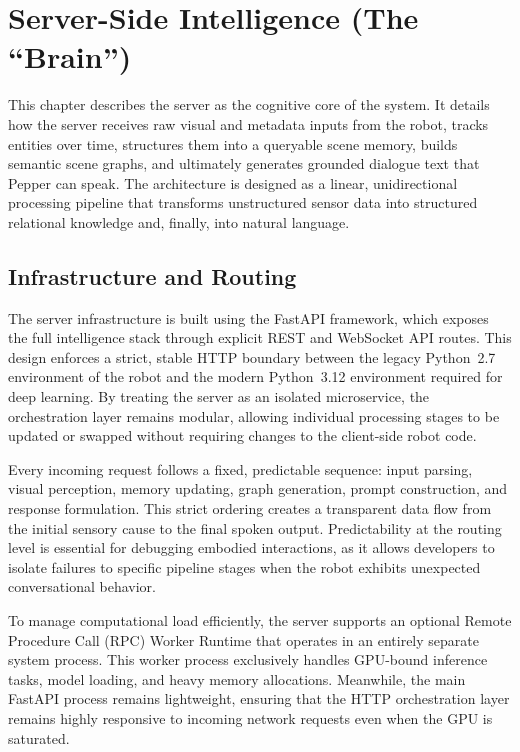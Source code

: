 \chapter{Server-Side Intelligence (The ``Brain'')}
\label{chap:server_side}

This chapter describes the server as the cognitive core of the system. It details how the server receives raw visual and metadata inputs from the robot, tracks entities over time, structures them into a queryable scene memory, builds semantic scene graphs, and ultimately generates grounded dialogue text that Pepper can speak. The architecture is designed as a linear, unidirectional processing pipeline that transforms unstructured sensor data into structured relational knowledge and, finally, into natural language.

\section{Infrastructure and Routing}
\label{sec:infrastructure}

The server infrastructure is built using the FastAPI framework, which exposes the full intelligence stack through explicit REST and WebSocket API routes. This design enforces a strict, stable HTTP boundary between the legacy Python~2.7 environment of the robot and the modern Python~3.12 environment required for deep learning. By treating the server as an isolated microservice, the orchestration layer remains modular, allowing individual processing stages to be updated or swapped without requiring changes to the client-side robot code.

Every incoming request follows a fixed, predictable sequence: input parsing, visual perception, memory updating, graph generation, prompt construction, and response formulation. This strict ordering creates a transparent data flow from the initial sensory cause to the final spoken output. Predictability at the routing level is essential for debugging embodied interactions, as it allows developers to isolate failures to specific pipeline stages when the robot exhibits unexpected conversational behavior.

To manage computational load efficiently, the server supports an optional Remote Procedure Call (RPC) Worker Runtime that operates in an entirely separate system process. This worker process exclusively handles GPU-bound inference tasks, model loading, and heavy memory allocations. Meanwhile, the main FastAPI process remains lightweight, ensuring that the HTTP orchestration layer remains highly responsive to incoming network requests even when the GPU is saturated.


